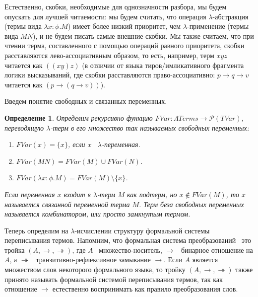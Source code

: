 \documentclass{article}[12pt]
\newtheorem{definition}{Определение}
\newcommand{\dash}{\textemdash\ }
\begin{document}
Естественно, скобки, необходимые для однозначности разбора, мы будем опускать для лучшей читаемости:
мы будем считать, что операция $\lambda$-абстракция (термы вида $\lambda x : \phi . M$) имеет более
низкий приоритет, чем $\lambda$-применение (термы вида $MN$), и не будем писать самые внешние скобки.
Мы также считаем, что при чтении терма, составленного с помощью операций равного приоритета,
скобки расставляются лево-ассоциативным образом, то есть, например, терм $xyz$ читается как $((xy)z)$
(в отличии от языка тиров/имликативного фрагмента логики высказываний, где скобки расставляются
право-ассоциативно: $p \rightarrow q \rightarrow v$ читается как $(p \rightarrow (q \rightarrow v))$).

Введем понятие свободных и связанных переменных.
\begin{definition}
    Определим рекурсивно функцию $FVar : \Lambda Terms \rightarrow \mathcal{P}(TVar)$,
    переводящую $\lambda$-терм в его множество так называемых свободных переменных:
    \begin{enumerate}
        \item $FVar(x) = \{ x \}$, если $x$ \dash $\lambda$-переменная.
        \item $FVar(MN) = FVar(M) \cup FVar(N)$.
        \item $FVar(\lambda x : \phi . M) = FVar(M) \setminus \{ x \}$.
    \end{enumerate}
    Если переменная $x$ входит в $\lambda$-терм $M$ как подтерм, но $x \not \in FVar(M)$, то $x$
    называется связанной переменной терма $M$. Терм беза свободных переменных называется
    комбинатором, или просто замкнутым термом.
\end{definition}

Теперь определим на $\lambda$-исчислении структуру формальной системы переписывания термов.
Напомним, что формальная система преобразований \dash это тройка $(A, \rightarrow, \twoheadrightarrow)$,
где $A$ \dash множество-носитель, $\rightarrow$ \dash бинарное отношение на $A$, а
$\twoheadrightarrow$ \dash транзитивно-рефлексивное замыкание $\rightarrow$. Если $A$ является
множеством слов некоторого формального языка, то тройку $(A, \rightarrow, \twoheadrightarrow)$ также
принято называть формальной системой переписывания термов, так как отношение $\rightarrow$
естественно воспринимать как правило преобразования слов.
\end{document}
